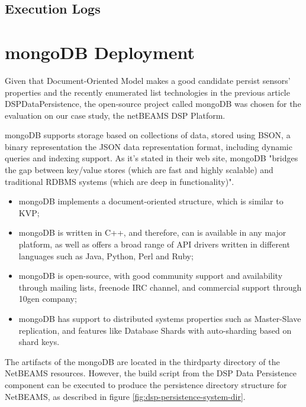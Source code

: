 \subsection{Execution Logs}

\section{mongoDB Deployment}
\label{sec:mongodb-deployment}

Given that Document-Oriented Model makes a good candidate persist sensors'
properties and the recently enumerated list technologies in the previous
article DSPDataPersistence, the open-source project called mongoDB was chosen
for the evaluation on our case study, the netBEAMS DSP Platform.

mongoDB supports storage based on collections of data, stored using BSON, a
binary representation the JSON data representation format, including dynamic
queries and indexing support. As it's stated in their web site, mongoDB
"bridges the gap between key/value stores (which are fast and highly scalable)
and traditional RDBMS systems (which are deep in functionality)".

\begin{itemize}
  \item mongoDB implements a document-oriented structure, which is similar to
  KVP;
  \item mongoDB is written in C++, and therefore, can is available in any major
  platform, as well as offers a broad range of API drivers written in different
  languages such as Java, Python, Perl and Ruby; 
  \item mongoDB is open-source, with good community support and availability
  through mailing lists, freenode IRC channel, and commercial support through
  10gen company; 
  \item mongoDB has support to distributed systems properties such as
  Master-Slave replication, and features like Database Shards with
  auto-sharding based on shard keys.
\end{itemize}

The artifacts of the mongoDB are located in the thirdparty directory of the
NetBEAMS resources. However, the build script from the DSP Data Persistence
component can be executed to produce the persistence directory
structure for NetBEAMS, as described in figure
\ref{fig:dsp-persistence-system-dir}.

